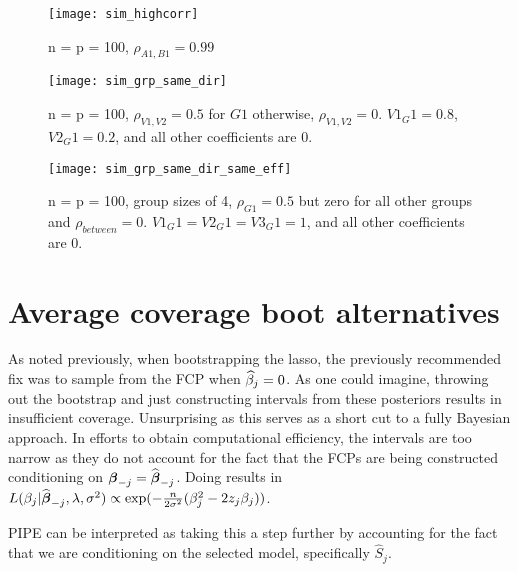 \begin{figure}[hbtp]
    \begin{center}
    \texttt{[image: sim\_highcorr]}
    \caption{\label{Fig:sim_highcorr} n = p = 100, $\rho_{A1, B1} = 0.99$}
    \end{center}
\end{figure}

\begin{figure}[hbtp]
    \begin{center}
    \texttt{[image: sim\_grp\_same\_dir]}
    \caption{\label{Fig:sim_grp_same_dir} n = p = 100, $\rho_{V1, V2} = 0.5$ for $G1$ otherwise, $\rho_{V1, V2} = 0$. $V1_G1 = 0.8$, $V2_G1 = 0.2$, and all other coefficients are 0.}
    \end{center}
\end{figure}

\begin{figure}[hbtp]
    \begin{center}
    \texttt{[image: sim\_grp\_same\_dir\_same\_eff]}
    \caption{\label{Fig:ssim_grp_same_dir_same_eff} n = p = 100, group sizes of 4, $\rho_{G1} = 0.5$ but zero for all other groups and $\rho_{between} = 0$. $V1_G1 = V2_G1 = V3_G1 = 1$, and all other coefficients are 0.}
    \end{center}
\end{figure}

\newpage
\section{Average coverage boot alternatives}

As noted previously, when bootstrapping the lasso, the previously recommended fix was to sample from the FCP when $\widehat{\beta}_j = 0$. As one could imagine, throwing out the bootstrap and just constructing intervals from these posteriors results in insufficient coverage. Unsurprising as this serves as a short cut to a fully Bayesian approach. In efforts to obtain computational efficiency, the intervals are too narrow as they do not account for the fact that the FCPs are being constructed conditioning on $\boldsymbol{\beta}_{-j} = \widehat{\boldsymbol{\beta}}_{-j}$. Doing results in $L(\beta_j|\widehat{\boldsymbol{\beta}}_{-j}, \lambda, \sigma^2) \propto \exp(-\frac{n}{2\sigma^2}(\beta_{j}^2 - 2 z_{j} \beta_{j}))$.

PIPE can be interpreted as taking this a step further by accounting for the fact that we are conditioning on the selected model, specifically $\hat{S}_j$. 

